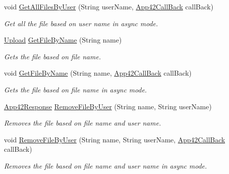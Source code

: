 \begin{DoxyCompactItemize}
void \hyperlink{classcom_1_1shephertz_1_1app42_1_1paas_1_1sdk_1_1csharp_1_1upload_1_1_upload_service_ae1e10ded2f71128321a44bd1d168e28a}{Get\+All\+Files\+By\+User} (String user\+Name, \hyperlink{interfacecom_1_1shephertz_1_1app42_1_1paas_1_1sdk_1_1csharp_1_1_app42_call_back}{App42\+Call\+Back} call\+Back)
\begin{DoxyCompactList}\small\item\em Get all the file based on user name in async mode. \end{DoxyCompactList}\item 
\hyperlink{classcom_1_1shephertz_1_1app42_1_1paas_1_1sdk_1_1csharp_1_1upload_1_1_upload}{Upload} \hyperlink{classcom_1_1shephertz_1_1app42_1_1paas_1_1sdk_1_1csharp_1_1upload_1_1_upload_service_a186906ba6d26889c6c36c178816d0425}{Get\+File\+By\+Name} (String name)
\begin{DoxyCompactList}\small\item\em Gets the file based on file name. \end{DoxyCompactList}\item 
void \hyperlink{classcom_1_1shephertz_1_1app42_1_1paas_1_1sdk_1_1csharp_1_1upload_1_1_upload_service_ac8813451481d69e7140d8cdc1f018d79}{Get\+File\+By\+Name} (String name, \hyperlink{interfacecom_1_1shephertz_1_1app42_1_1paas_1_1sdk_1_1csharp_1_1_app42_call_back}{App42\+Call\+Back} call\+Back)
\begin{DoxyCompactList}\small\item\em Gets the file based on file name in async mode. \end{DoxyCompactList}\item 
\hyperlink{classcom_1_1shephertz_1_1app42_1_1paas_1_1sdk_1_1csharp_1_1_app42_response}{App42\+Response} \hyperlink{classcom_1_1shephertz_1_1app42_1_1paas_1_1sdk_1_1csharp_1_1upload_1_1_upload_service_a0b0b7dde21a45952564e8bc1e192a3de}{Remove\+File\+By\+User} (String name, String user\+Name)
\begin{DoxyCompactList}\small\item\em Removes the file based on file name and user name. \end{DoxyCompactList}\item 
void \hyperlink{classcom_1_1shephertz_1_1app42_1_1paas_1_1sdk_1_1csharp_1_1upload_1_1_upload_service_a3f088912847d0456af63143badcf2ef2}{Remove\+File\+By\+User} (String name, String user\+Name, \hyperlink{interfacecom_1_1shephertz_1_1app42_1_1paas_1_1sdk_1_1csharp_1_1_app42_call_back}{App42\+Call\+Back} call\+Back)
\begin{DoxyCompactList}\small\item\em Removes the file based on file name and user name in async mode. \end{DoxyCompactList}\item 

\end{DoxyCompactItemize}
